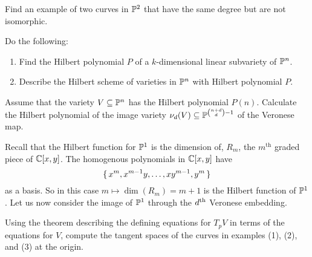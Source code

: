 \documentclass[12pt]{memoir}
\begin{document}
\begin{Ej}
	Find an example of two curves in $\mathbb{P}^2$ that have the same
	degree but are not isomorphic.
\end{Ej}

\begin{ptcbr}

\end{ptcbr}

\begin{Ej}
	Do the following:
	\begin{enumerate}
		\item Find the Hilbert polynomial $P$ of a $k$-dimensional linear
		      subvariety of $\mathbb{P}^n$.
		\item  Describe the Hilbert scheme of varieties in $\mathbb{P}^n$ with Hilbert
		      polynomial $P$.
	\end{enumerate}

\end{Ej}

\begin{ptcbr}

\end{ptcbr}

\begin{Ej}
	Assume that the variety $V\subseteq\mathbb{P}^n$ has the Hilbert polynomial
	$P(n)$. Calculate the Hilbert polynomial of the image variety $\nu_d(V)\subseteq \mathbb{P}^{\binom{n+d}{d}-1}$ of the Veronese map. 
\end{Ej}

\begin{ptcbr}
Recall that the Hilbert function for $\mathbb{P}^1$ is the dimension of, $R_m$, the $m^{\text{th}}$ graded piece of $\mathbb{C}[x,y]$. The homogenous polynomials in $\mathbb{C}[x,y]$ have 
$$\{\,x^m,x^{m-1}y,\dots,xy^{m-1},y^m\,\}$$
as a basis. So in this case $m\mapsto \dim(R_m)=m+1$ is the Hilbert function of $\mathbb{P}^1$. Let us now consider the image of $\mathbb{P}^1$ through the $d\textsuperscript{th}$ Veronese embedding.
\end{ptcbr}

\begin{Ej}
	Using the theorem describing the defining equations for
	$T_pV$ in terms of the equations for $V$, compute the tangent spaces of the
	curves in examples (1), (2), and (3) at the origin.
\end{Ej}
\end{document}
